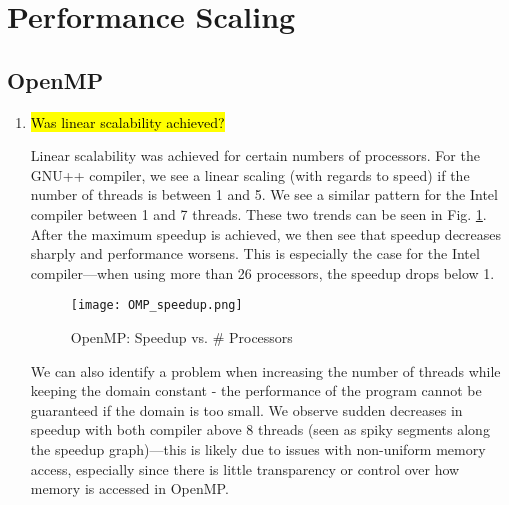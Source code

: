 \documentclass{article}
\begin{document}

\section{Performance Scaling}
\subsection{OpenMP}
\begin{enumerate}
	\item \hl{Was linear scalability achieved?}

	Linear scalability was achieved for certain numbers of processors. For the GNU++ compiler, we see a linear scaling (with regards to speed) if the number of threads is between 1 and 5. We see a similar pattern for the Intel compiler between 1 and 7 threads. These two trends can be seen in Fig. \ref{fig:omp_speedup}. After the maximum speedup is achieved, we then see that speedup decreases sharply and performance worsens. This is especially the case for the Intel compiler---when using more than 26 processors, the speedup drops below 1. 

	\begin{figure}[ht!] %
	 	\begin{center}
	 		\texttt{[image: OMP\_speedup.png]} %
	 		\caption{OpenMP: Speedup vs. \# Processors}
	 		\label{fig:omp_speedup}
	 	\end{center}
	\end{figure}

	We can also identify a problem when increasing the number of threads while keeping the domain constant - the performance of the program cannot be guaranteed if the domain is too small. We observe sudden decreases in speedup with both compiler above 8 threads (seen as spiky segments along the speedup graph)---this is likely due to issues with non-uniform memory access, especially since there is little transparency or control over how memory is accessed in OpenMP.


\end{enumerate}
\end{document}
